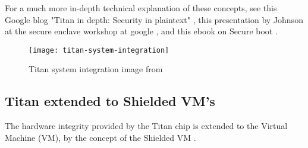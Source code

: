 For a much more in-depth technical explanation of these concepts, 
see this Google blog "Titan in depth: Security in plaintext" \cite{savagaonkar_titan_2017},
this presentation by Johnson at the secure enclave workshop at google \citep{johnson_titan_2018}, 
and this ebook on Secure boot \citep{yao_understanding_2021}.

\begin{figure}[!ht]
    \centering
    \texttt{[image: titan-system-integration]}
    \caption{Titan system integration image from \cite{yao_understanding_2021}}
    \label{fig:titan-system-integration}
\end{figure}


\subsection{Titan extended to Shielded VM’s}
The hardware integrity provided by the Titan chip is extended 
to the Virtual Machine (VM), by the concept of the Shielded VM 
\citep{leibl_gcp_2022}.

